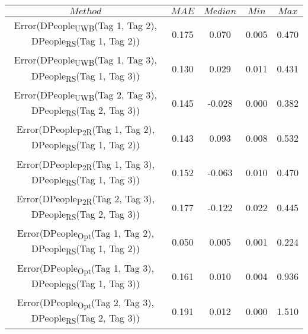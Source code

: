 \begin{table}[h]
\centering
{\small
\begin{tabular}{|c|c|c|c|c|}
\hline
$Method$ & $MAE$ & $Median$ & $Min$ & $Max$ \\
\hline
{\scriptsize Error(DPeople\textsubscript{UWB}(Tag 1, Tag 2), DPeople\textsubscript{RS}(Tag 1, Tag 2))} & 0.175 & 0.070 & 0.005 & 0.470 \\
\hline
{\scriptsize Error(DPeople\textsubscript{UWB}(Tag 1, Tag 3), DPeople\textsubscript{RS}(Tag 1, Tag 3))} & 0.130 & 0.029 & 0.011 & 0.431 \\
\hline
{\scriptsize Error(DPeople\textsubscript{UWB}(Tag 2, Tag 3), DPeople\textsubscript{RS}(Tag 2, Tag 3))} & 0.145 & -0.028 & 0.000 & 0.382 \\
\hline
{\scriptsize Error(DPeople\textsubscript{P2R}(Tag 1, Tag 2), DPeople\textsubscript{RS}(Tag 1, Tag 2))} & 0.143 & 0.093 & 0.008 & 0.532 \\
\hline
{\scriptsize Error(DPeople\textsubscript{P2R}(Tag 1, Tag 3), DPeople\textsubscript{RS}(Tag 1, Tag 3))} & 0.152 & -0.063 & 0.010 & 0.470 \\
\hline
{\scriptsize Error(DPeople\textsubscript{P2R}(Tag 2, Tag 3), DPeople\textsubscript{RS}(Tag 2, Tag 3))} & 0.177 & -0.122 & 0.022 & 0.445 \\
\hline
{\scriptsize Error(DPeople\textsubscript{Opt}(Tag 1, Tag 2), DPeople\textsubscript{RS}(Tag 1, Tag 2))} & 0.050 & 0.005 & 0.001 & 0.224 \\
\hline
{\scriptsize Error(DPeople\textsubscript{Opt}(Tag 1, Tag 3), DPeople\textsubscript{RS}(Tag 1, Tag 3))} & 0.161 & 0.010 & 0.004 & 0.936 \\
\hline
{\scriptsize Error(DPeople\textsubscript{Opt}(Tag 2, Tag 3), DPeople\textsubscript{RS}(Tag 2, Tag 3))} & 0.191 & 0.012 & 0.000 & 1.510 \\
\hline
\end{tabular}
}
\end{table}
